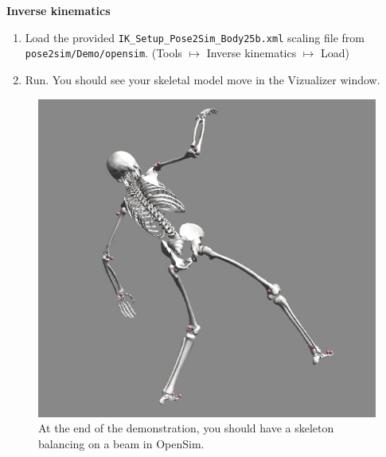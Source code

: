\textbf{Inverse kinematics}
\begin{enumerate}[itemsep=0em, topsep=0em, leftmargin=*]
    \item Load the provided \texttt{IK_Setup_Pose2Sim_Body25b.xml} scaling file from \texttt{pose2sim/Demo/opensim}. (Tools $\mapsto$ Inverse kinematics $\mapsto$ Load)
    \item Run. You should see your skeletal model move in the Vizualizer window.
\end{enumerate}

\begin{figure}[hbtp]
	\centering
	\def\svgwidth{1\columnwidth}
	\fontsize{10pt}{10pt}\selectfont
	\includegraphics[width=\linewidth]{"../Chap3/Figures/Fig_OpenSimDemo.JPG"}
	\caption{At the end of the demonstration, you should have a skeleton balancing on a beam in OpenSim.}
	\label{fig_opensimdemo}
\end{figure}

\clearpage

